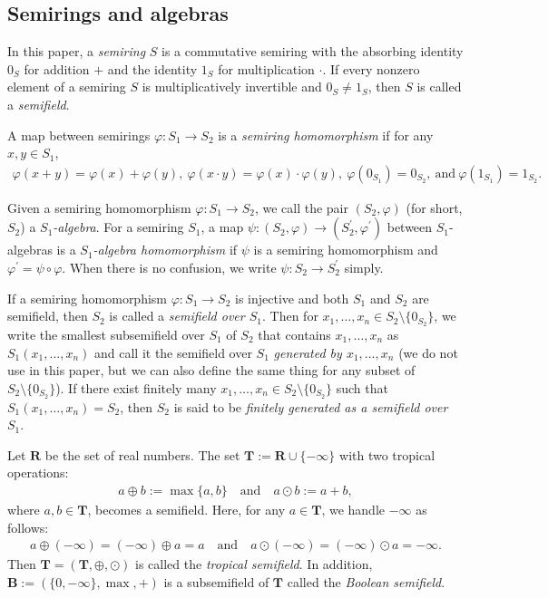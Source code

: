 \documentclass[a4paper,12pt]{amsart}
\begin{document}
\subsection{Semirings and algebras}
	\label{subsection2.1}

In this paper, a \textit{semiring} $S$ is a commutative semiring with the absorbing identity $0_S$ for addition $+$ and the identity $1_S$ for multiplication $\cdot$.
If every nonzero element of a semiring $S$ is multiplicatively invertible and $0_S \not= 1_S$, then $S$ is called a \textit{semifield}.

A map between semirings $\varphi : S_1 \to S_2$ is a \textit{semiring homomorphism} if for any $x, y \in S_1$,
\begin{align*}
\varphi(x + y) = \varphi(x) + \varphi(y), \	\varphi(x \cdot y) = \varphi(x) \cdot \varphi(y), \	\varphi(0_{S_1}) = 0_{S_2}, \   \text{and}\	\varphi(1_{S_1}) = 1_{S_2}.
\end{align*}

Given a semiring homomorphism $\varphi : S_1 \to S_2$, we call the pair $(S_2, \varphi)$ (for short, $S_2$) a \textit{$S_1$-algebra}.
For a semiring $S_1$, a map $\psi : (S_2, \varphi) \to (S_2^{\prime}, \varphi^{\prime})$ between $S_1$-algebras is a \textit{$S_1$-algebra homomorphism} if $\psi$ is a semiring homomorphism and $\varphi^{\prime} = \psi \circ \varphi$.
When there is no confusion, we write $\psi : S_2 \to S_2^{\prime}$ simply.

If a semiring homomorphism $\varphi : S_1 \to S_2$ is injective and both $S_1$ and $S_2$ are semifield, then $S_2$ is called a \textit{semifield over $S_1$}.
Then for $x_1, \ldots, x_n \in S_2 \setminus \{ 0_{S_2} \}$, we write the smallest subsemifield over $S_1$ of $S_2$ that contains $x_1, \ldots, x_n$ as $S_1(x_1, \ldots, x_n)$ and call it the semifield over $S_1$ \textit{generated by $x_1, \ldots, x_n$} (we do not use in this paper, but we can also define the same thing for any subset of $S_2 \setminus \{ 0_{S_2} \}$).
If there exist finitely many $x_1, \ldots, x_n \in S_2 \setminus \{ 0_{S_2} \}$ such that $S_1(x_1, \ldots, x_n) = S_2$, then $S_2$ is said to be \textit{finitely generated as a semifield over $S_1$}.

Let $\boldsymbol{R}$ be the set of real numbers.
The set $\boldsymbol{T} := \boldsymbol{R} \cup \{ -\infty \}$ with two tropical operations:
\begin{align*}
a \oplus b := \operatorname{max}\{ a, b \} \quad	\text{and} \quad a \odot b := a + b,
\end{align*}
where $a, b \in \boldsymbol{T}$, becomes a semifield.
Here, for any $a \in \boldsymbol{T}$, we handle $-\infty$ as follows:
\begin{align*}
a \oplus (-\infty) = (-\infty) \oplus a = a \quad \text{and} \quad a \odot (-\infty) = (-\infty) \odot a = -\infty.
\end{align*}
Then $\boldsymbol{T} = (\boldsymbol{T}, \oplus, \odot)$ is called the \textit{tropical semifield}.
In addition, $\boldsymbol{B} := (\{ 0, -\infty \}, \operatorname{max}, +)$ is a subsemifield of $\boldsymbol{T}$ called the \textit{Boolean semifield}.
\end{document}
